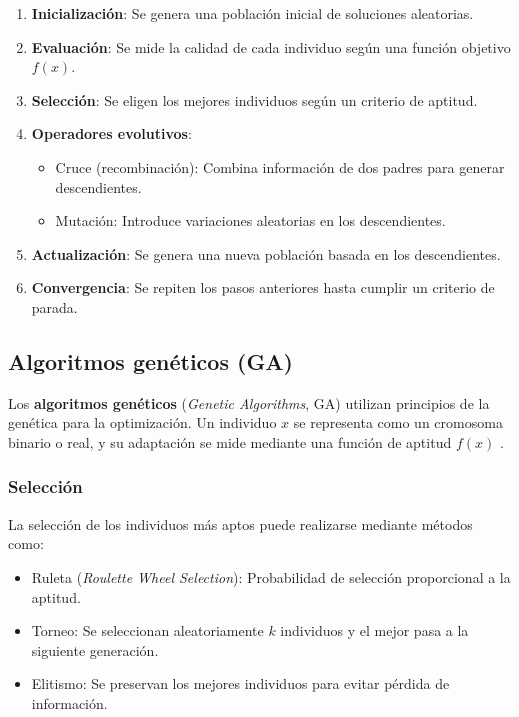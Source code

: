 \begin{itemize}
		\begin{enumerate}
			\item \textbf{Inicialización}: Se genera una población inicial de soluciones aleatorias.
			\item \textbf{Evaluación}: Se mide la calidad de cada individuo según una función objetivo \( f(x) \).
			\item \textbf{Selección}: Se eligen los mejores individuos según un criterio de aptitud.
			\item \textbf{Operadores evolutivos}:
			\begin{itemize}
				\item Cruce (recombinación): Combina información de dos padres para generar descendientes.
				\item Mutación: Introduce variaciones aleatorias en los descendientes.
			\end{itemize}
			\item \textbf{Actualización}: Se genera una nueva población basada en los descendientes.
			\item \textbf{Convergencia}: Se repiten los pasos anteriores hasta cumplir un criterio de parada.
		\end{enumerate}
		
		\subsection{Algoritmos genéticos (GA)}
		
		Los \textbf{algoritmos genéticos} (\textit{Genetic Algorithms}, GA) utilizan principios de la genética para la optimización. Un individuo \( x \) se representa como un cromosoma binario o real, y su adaptación se mide mediante una función de aptitud \( f(x) \) \cite{holland1975adaptation}.
		
		\subsubsection{Selección}
		
		La selección de los individuos más aptos puede realizarse mediante métodos como:
		\begin{itemize}
			\item Ruleta (\textit{Roulette Wheel Selection}): Probabilidad de selección proporcional a la aptitud.
			\item Torneo: Se seleccionan aleatoriamente \( k \) individuos y el mejor pasa a la siguiente generación.
			\item Elitismo: Se preservan los mejores individuos para evitar pérdida de información.
		\end{itemize}
		

\end{itemize}
